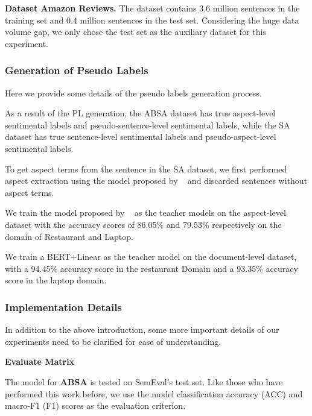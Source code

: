 \documentclass[11pt]{article}
\begin{document}
\textbf{Dataset Amazon Reviews.}
The dataset contains 3.6 million sentences in the training set and 0.4 million sentences in the test set. Considering the huge data volume gap, we only chose the test set as the auxiliary dataset for this experiment. 









\subsubsection{Generation of Pseudo Labels}
Here we provide some details of the pseudo labels generation process.



As a result of the PL generation, the ABSA dataset has true aspect-level sentimental labels and pseudo-sentence-level sentimental labels, while the SA dataset has true sentence-level sentimental labels and pseudo-aspect-level sentimental labels.

To get aspect terms from the sentence in the SA dataset, we first performed aspect extraction using the model proposed by ~\citet{li-etal-2019-exploiting} and discarded sentences without aspect terms.


We train the model proposed by ~\cite{bai2020investigating} as the teacher models on the aspect-level dataset with the accuracy scores of 86.05\% and 79.53\% respectively on the domain of Restaurant and Laptop.

We train a BERT+Linear as the teacher model on the document-level dataset, with a 94.45\% accuracy score in the restaurant Domain and a 93.35\% accuracy score in the laptop domain.









\subsubsection{Implementation Details}
In addition to the above introduction, some more important details of our experiments need to be clarified for ease of understanding.

\textbf{Evaluate Matrix}

The model for \textbf{ABSA} is tested on SemEval's test set. Like those who have performed this work before, we use the model classification accuracy (ACC) and macro-F1 (F1) scores as the evaluation criterion.
\end{document}
